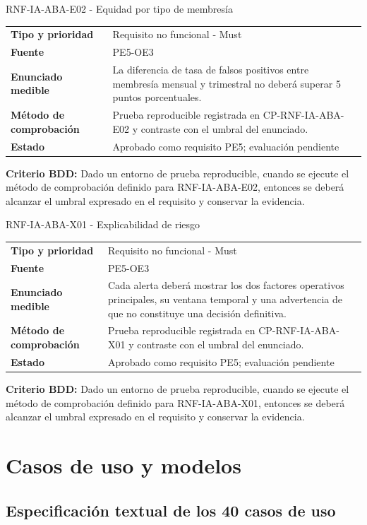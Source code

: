 \documentclass[11pt,a4paper]{article}
\begin{document}
\begin{reqbox}[colframe=Teal]{RNF-IA-ABA-E02 - Equidad por tipo de membresía}
\begin{tabularx}{\textwidth}{>{\bfseries}p{3.2cm}Y}
Tipo y prioridad & Requisito no funcional - Must \\
Fuente & PE5-OE3 \\
Enunciado medible & La diferencia de tasa de falsos positivos entre membresía mensual y trimestral no deberá superar 5 puntos porcentuales. \\
Método de comprobación & Prueba reproducible registrada en CP-RNF-IA-ABA-E02 y contraste con el umbral del enunciado. \\
Estado & Aprobado como requisito PE5; evaluación pendiente \\
\end{tabularx}
\textbf{Criterio BDD:} Dado un entorno de prueba reproducible, cuando se ejecute el método de comprobación definido para RNF-IA-ABA-E02, entonces se deberá alcanzar el umbral expresado en el requisito y conservar la evidencia.
\end{reqbox}


\begin{reqbox}[colframe=Teal]{RNF-IA-ABA-X01 - Explicabilidad de riesgo}
\begin{tabularx}{\textwidth}{>{\bfseries}p{3.2cm}Y}
Tipo y prioridad & Requisito no funcional - Must \\
Fuente & PE5-OE3 \\
Enunciado medible & Cada alerta deberá mostrar los dos factores operativos principales, su ventana temporal y una advertencia de que no constituye una decisión definitiva. \\
Método de comprobación & Prueba reproducible registrada en CP-RNF-IA-ABA-X01 y contraste con el umbral del enunciado. \\
Estado & Aprobado como requisito PE5; evaluación pendiente \\
\end{tabularx}
\textbf{Criterio BDD:} Dado un entorno de prueba reproducible, cuando se ejecute el método de comprobación definido para RNF-IA-ABA-X01, entonces se deberá alcanzar el umbral expresado en el requisito y conservar la evidencia.
\end{reqbox}

\section{Casos de uso y modelos}
\subsection{Especificación textual de los 40 casos de uso}

\end{document}
